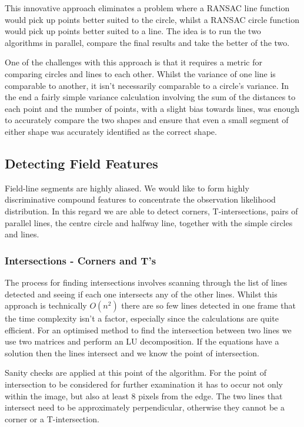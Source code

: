 \documentclass{article}
\begin{document}
This innovative approach eliminates a problem where a RANSAC line function would pick up points better suited to the circle, whilst a RANSAC circle function would pick up points better suited to a line. The idea is to run the two algorithms in parallel, compare the final results and take the better of the two.

One of the challenges with this approach is that it requires a metric for comparing circles and lines to each other. Whilst the variance of one line is comparable to another, it isn't necessarily comparable to a circle's variance. In the end a fairly simple variance calculation involving the sum of the distances to each point and the number of points, with a slight bias towards lines, was enough to accurately compare the two shapes and ensure that even a small segment of either shape was accurately identified as the correct shape.

\subsection{Detecting Field Features}
Field-line segments are highly aliased. We would like to form highly discriminative compound features to concentrate the observation likelihood distribution. In this regard we are able to detect corners, T-intersections, pairs of parallel lines, the centre circle and halfway line, together with the simple circles and lines.

\subsubsection{Intersections - Corners and T's}
The process for finding intersections involves scanning through the list of lines detected and seeing if each one intersects any of the other lines. Whilst this approach is technically $O(n^2)$ there are so few lines detected in one frame that the time complexity isn't a factor, especially since the calculations are quite efficient. For an optimised method to find the intersection between two lines we use two matrices and perform an LU decomposition. If the equations have a solution then the lines intersect and we know the point of intersection.

Sanity checks are applied at this point of the algorithm. For the point of intersection to be considered for further examination it has to occur not only within the image, but also at least 8 pixels from the edge. The two lines that intersect need to be approximately perpendicular, otherwise they cannot be a corner or a T-intersection.
\end{document}
